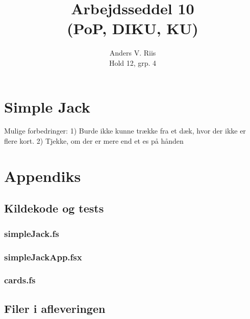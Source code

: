 \documentclass{pop}
\author{Anders V. Riis \\ Hold 12, grp. 4}
\title{Arbejdsseddel 10 \\(PoP, DIKU, KU)}
\begin{document}
\maketitle
\section*{Simple Jack}
Mulige forbedringer:
1) Burde ikke kunne trække fra et dæk, hvor der ikke er flere kort.
2) Tjekke, om der er mere end et es på hånden
\newpage 
\appendix
\section*{Appendiks}
\subsection*{Kildekode og tests}
\subsubsection*{simpleJack.fs}

\subsubsection*{simpleJackApp.fsx}

\subsubsection*{cards.fs}

\subsection*{Filer i afleveringen}
\end{document}
